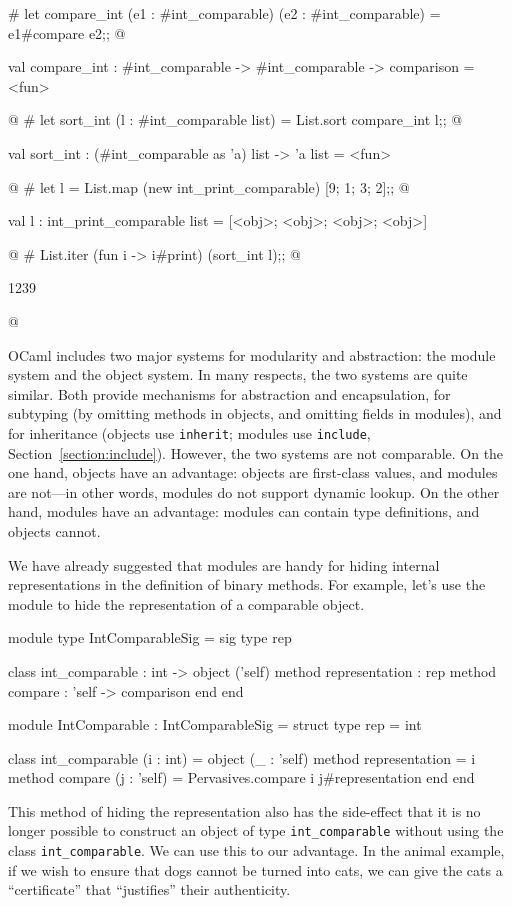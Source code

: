 \begin{ocaml}
# let compare_int (e1 : #int_comparable) (e2 : #int_comparable) =
     e1#compare e2;;
@
\begin{topoutput}
val compare_int : #int_comparable -> #int_comparable -> comparison = <fun>
\end{topoutput}
@
# let sort_int (l : #int_comparable list) =
     List.sort compare_int l;;
@
\begin{topoutput}
val sort_int : (#int_comparable as 'a) list -> 'a list = <fun>
\end{topoutput}
@
# let l = List.map (new int_print_comparable) [9; 1; 3; 2];;
@
\begin{topoutput}
val l : int_print_comparable list = [<obj>; <obj>; <obj>; <obj>]
\end{topoutput}
@
# List.iter (fun i -> i#print) (sort_int l);;
@
\begin{topoutput}
1239
\end{topoutput}
@
\end{ocaml}


OCaml includes two major systems for modularity and abstraction: the module system and the object
system.  In many respects, the two systems are quite similar.  Both provide mechanisms for
abstraction and encapsulation, for subtyping (by omitting methods in objects, and omitting fields in
modules), and for inheritance (objects use \hbox{\lstinline/inherit/}; modules use \hbox{\lstinline/include/},
Section~\ref{section:include}).  However, the two systems are not comparable.  On the one hand,
objects have an advantage: objects are first-class values, and modules are not---in other words,
modules do not support dynamic lookup.  On the other hand, modules have an advantage: modules
can contain type definitions, and objects cannot.

We have already suggested that modules are handy for hiding internal representations in the definition of
binary methods.  For example, let's use the module to hide the representation of a comparable object.

\begin{ocaml}
module type IntComparableSig =
sig
   type rep

   class int_comparable : int ->
   object ('self)
      method representation : rep
      method compare : 'self -> comparison
   end
end

module IntComparable : IntComparableSig =
struct
   type rep = int

   class int_comparable (i : int) =
   object (_ : 'self)
      method representation = i
      method compare (j : 'self) =
         Pervasives.compare i j#representation
   end
end
\end{ocaml}
%
This method of hiding the representation also has the side-effect that it is no longer possible to
construct an object of type \hbox{\lstinline/int_comparable/} without using the
class \hbox{\lstinline/int_comparable/}.  We can use this to our advantage.  In the animal example, if we
wish to ensure that dogs cannot be turned into cats, we can give the cats a ``certificate'' that
``justifies'' their authenticity.

